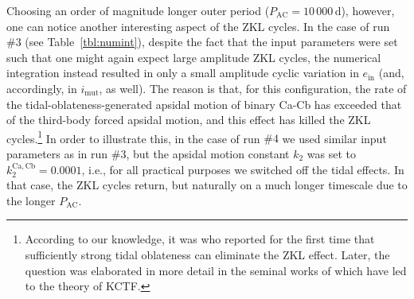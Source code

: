 \documentclass[fleqn,usenatbib]{mnras} %
\begin{document}
Choosing an order of magnitude longer outer period ($P_\mathrm{AC}=10\,000$\,d), however, one can notice another interesting aspect of the ZKL cycles. In the case of run $\#3$ (see Table~\ref{tbl:numint}), despite the fact that the input parameters were set such that one might again expect large amplitude ZKL cycles, the numerical integration instead resulted in only a small amplitude cyclic variation in $e_\mathrm{in}$ (and, accordingly, in $i_\mathrm{mut}$, as well). The reason is that, for this configuration, the rate of the tidal-oblateness-generated apsidal motion of binary Ca-Cb has exceeded that of the third-body forced apsidal motion, and this effect has killed the ZKL cycles.\footnote{According to our knowledge, it was \citet{Soderhjelm1984} who reported for the first time that sufficiently strong tidal oblateness can eliminate the ZKL effect. Later, the question was elaborated in more detail in the seminal works of \citet{Eggleton1998,Kiseleva1998} which have led to the theory of KCTF.} In order to illustrate this, in the case of run $\#4$ we used similar input parameters as in run $\#3$, but the apsidal motion constant $k_2$ was set to $k_2^\mathrm{Ca,Cb}=0.0001$, i.e., for all practical purposes we switched off the tidal effects. In that case, the ZKL cycles return, but naturally on a much longer timescale due to the longer $P_\mathrm{AC}$.
\end{document}

